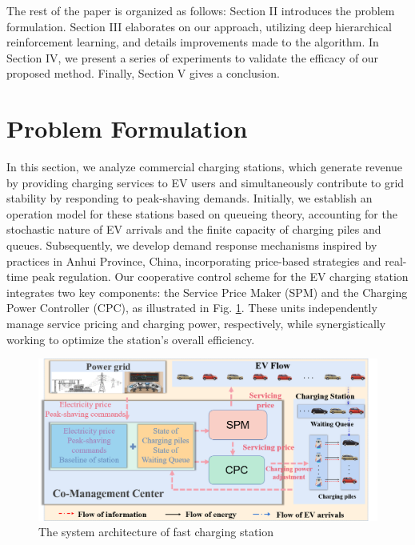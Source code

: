 \documentclass[preprint,12pt]{elsarticle}
\begin{document}
The rest of the paper is organized as follows: Section II introduces
the problem formulation. Section III elaborates on our approach, utilizing
deep hierarchical reinforcement learning, and details improvements
made to the algorithm. In Section IV, we present a series of experiments
to validate the efficacy of our proposed method. Finally, Section
V gives a conclusion.


\section{Problem Formulation}
In this section, we analyze commercial charging stations, which generate revenue by providing charging services to EV users and simultaneously contribute to grid stability by responding to peak-shaving demands. Initially, we establish an operation model for these stations based on queueing theory, accounting for the stochastic nature of EV arrivals and the finite capacity of charging piles and queues. Subsequently, we develop demand response mechanisms inspired by practices in Anhui Province, China, incorporating price-based strategies and real-time peak regulation. Our cooperative control scheme for the EV charging station integrates two key components: the Service Price Maker (SPM) and the Charging Power Controller (CPC), as illustrated in Fig. \ref{fig:The-system-architecture}. These units independently manage service pricing and charging power, respectively, while synergistically working to optimize the station's overall efficiency.
\begin{figure}[tbh]
    \centering
    \includegraphics[width=1\linewidth]{figures/operating_mode.png}
    \caption{The system architecture of fast charging station}
    \label{fig:The-system-architecture}
\end{figure}
\end{document}
